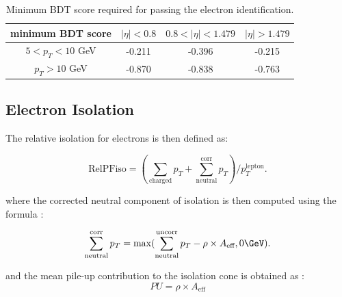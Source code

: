 \begin{table}[h!]
\scriptsize
    \centering
    \begin{tabular}{c|c c c}
\hline %
minimum BDT score    &  $|\eta| < 0.8 $ & $0.8 < |\eta| < 1.479$ 	& $|\eta| > 1.479$      \\
\hline %
$ 5 < p_T < 10 $ GeV &  -0.211      & -0.396  		& -0.215		\\
$p_T > 10$ GeV       &  -0.870		& -0.838		& -0.763		\\
\hline %
\hline %
     \end{tabular}
\small
    \caption{Minimum BDT score required for passing the electron identification.}
    \label{tab:ele_ID_WP}
\end{table}


\subsection{Electron Isolation}
\label{sec:eleiso}

The relative isolation for electrons is then defined as: 

\begin{equation}
\text{RelPFiso} = (\sum_{\text{charged}} p_T + \sum^{\text{corr}}_{\text{neutral}} p_T)/p_T^{\text{lepton}}  .
\label{eqn:elepfrelisoeqn}
\end{equation} 

where the corrected neutral component of isolation is then computed using the formula :

\begin{equation}
\label{eqn:neutralea}
  \sum^{\text{corr}}_{\text{neutral}} p_T = \text{max}(\sum^{\text{uncorr}}_{\text{neutral}} p_T - \rho \times A_\text{eff},0 \GeV)  .
\end{equation}

and the mean pile-up contribution to the isolation cone is obtained as :  
\begin{equation}
 PU =  \rho \times A_\text{eff}
\label{eqn:purho}
\end{equation}

